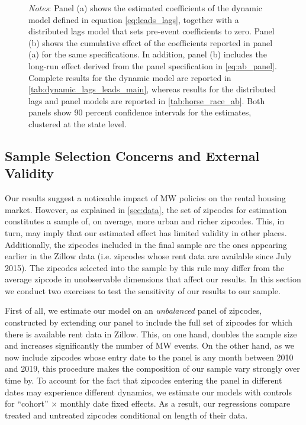 \begin{figure}[htb!]
\begin{minipage}{0.95\textwidth}
		\vspace{2mm} 
		\textit{Notes}: Panel (a) shows the estimated coefficients of the dynamic model defined in 
		equation \autoref{eq:leads_lags}, together with a distributed lags model that sets pre-event 
		coefficients to zero. Panel (b) shows the cumulative effect of the coefficients reported in 
		panel (a) for the same specifications. In addition, panel (b) includes the long-run effect 
		derived from the panel specification in \autoref{eq:ab_panel}. Complete results for the 
		dynamic model are reported in \autoref{tab:dynamic_lags_leads_main}, whereas results for the 
		distributed lags and panel models are reported in \autoref{tab:horse_race_ab}. Both panels
		show 90 percent confidence intervals for the estimates, clustered at the state level. 
	\end{minipage}
\end{figure}


\subsection{Sample Selection Concerns and External Validity}\label{sec:sample_rest}

Our results suggest a noticeable impact of MW policies on the rental housing market. However, as 
explained in \autoref{sec:data}, the set of zipcodes for estimation constitutes a sample of, on 
average, more urban and richer zipcodes. This, in turn, may imply that our estimated effect has 
limited validity in other places. Additionally, the zipcodes included in the final sample are the 
ones appearing earlier in the Zillow data (i.e. zipcodes whose rent data are available since July 
2015). The zipcodes selected into the sample by this rule may differ from the average zipcode 
in unobservable dimensions that affect our results. In this section we conduct two exercises to 
test the sensitivity of our results to our sample.

First of all, we estimate our model on an \textit{unbalanced} panel of zipcodes, constructed by 
extending our panel to include the full set of zipcodes for which there is available rent data in 
Zillow. This, on one hand, doubles the sample size and increases significantly the number of MW 
events. %
On the other hand, as we now include zipcodes whose entry date to the panel is any month between
2010 and 2019, this procedure makes the composition of our sample vary strongly over time by. To 
account for the fact that zipcodes entering the panel in different dates may experience different 
dynamics, we estimate our models with controls for ``cohort'' $\times$ monthly date fixed effects. 
As a result, our regressions compare treated and untreated zipcodes conditional on length of their 
data.

